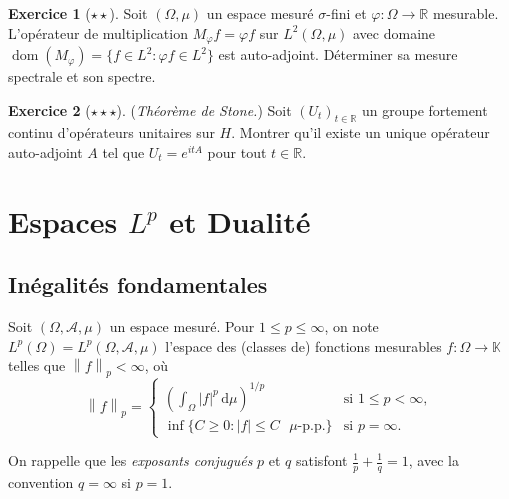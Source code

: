 \documentclass[a4paper,12pt]{book}
\DeclareMathOperator{\dom}{dom}
\newcommand{\R}{\mathbb{R}}
\newcommand{\K}{\mathbb{K}}
\newcommand{\dd}{\mathrm{d}}
\newcommand{\norm}[1]{\left\| #1 \right\|}
\newcommand{\abs}[1]{\left| #1 \right|}
\theoremstyle{definition}
\newtheorem{exercice}{Exercice}[chapter]
\theoremstyle{plain}
\theoremstyle{remark}
\begin{document}
\begin{exercice}[$\star\star$]
Soit $(\Omega, \mu)$ un espace mesuré $\sigma$-fini et $\varphi : \Omega \to \R$ mesurable.
L'opérateur de multiplication $M_\varphi f = \varphi f$ sur $L^2(\Omega, \mu)$ avec domaine
$\dom(M_\varphi) = \{f \in L^2 : \varphi f \in L^2\}$ est auto-adjoint. Déterminer sa
mesure spectrale et son spectre.
\end{exercice}

\begin{exercice}[$\star\star\star$]
(\emph{Théorème de Stone.}) Soit $(U_t)_{t \in \R}$ un groupe fortement continu
d'opérateurs unitaires sur $H$. Montrer qu'il existe un unique opérateur auto-adjoint $A$
tel que $U_t = e^{itA}$ pour tout $t \in \R$.
\end{exercice}


\chapter{Espaces $L^p$ et Dualité}
\label{chap:Lp}
\minitoc

\section{Inégalités fondamentales}

Soit $(\Omega, \mathcal{A}, \mu)$ un espace mesuré. Pour $1 \le p \le \infty$, on note
$L^p(\Omega) = L^p(\Omega, \mathcal{A}, \mu)$ l'espace des (classes de) fonctions
mesurables $f : \Omega \to \K$ telles que $\norm{f}_p < \infty$, où
\[
  \norm{f}_p = \begin{cases}
    \displaystyle \left(\int_\Omega \abs{f}^p\,\dd\mu\right)^{1/p} & \text{si } 1 \le p < \infty, \\[6pt]
    \displaystyle \inf\{C \ge 0 : \abs{f} \le C \text{ $\mu$-p.p.}\} & \text{si } p = \infty.
  \end{cases}
\]

On rappelle que les \emph{exposants conjugués} $p$ et $q$
satisfont $\frac{1}{p} + \frac{1}{q} = 1$, avec la convention $q = \infty$ si $p = 1$.
\end{document}
